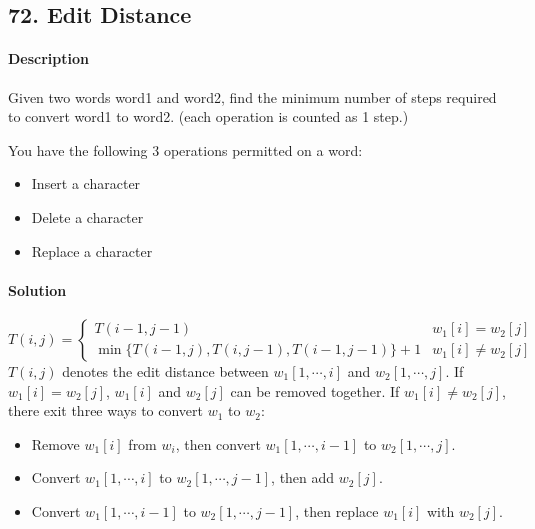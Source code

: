 \subsection{72. Edit Distance}

\paragraph{Description}

Given two words word1 and word2, find the minimum number of steps required to convert word1 to word2. (each operation is counted as 1 step.)

You have the following 3 operations permitted on a word:
\begin{itemize}
    \item Insert a character
    \item Delete a character
    \item Replace a character
\end{itemize}

\paragraph{Solution}

\begin{equation*}
    T(i,j)=\begin{cases}
    T(i-1,j-1) & w_1[i]=w_2[j]\\
    \min\{T(i-1,j),T(i,j-1),T(i-1,j-1)\}+1 & w_1[i]\neq w_2[j]
    \end{cases}
\end{equation*}
$T(i,j)$ denotes the edit distance between $w_1[1,\cdots,i]$ and $w_2[1,\cdots,j]$. If $w_1[i]=w_2[j]$, $w_1[i]$ and $w_2[j]$ can be removed together. If $w_1[i]\neq w_2[j]$, there exit three ways to convert $w_1$ to $w_2$:
\begin{itemize}
    \item Remove $w_1[i]$ from $w_i$, then convert $w_1[1,\cdots,i-1]$ to $w_2[1,\cdots,j]$.
    \item Convert $w_1[1,\cdots,i]$ to $w_2[1,\cdots,j-1]$, then add $w_2[j]$.
    \item Convert $w_1[1,\cdots,i-1]$ to $w_2[1,\cdots,j-1]$, then replace $w_1[i]$ with $w_2[j]$.
\end{itemize}